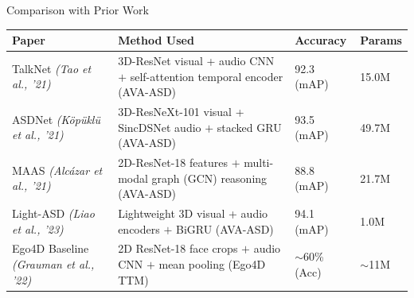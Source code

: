\documentclass[aspectratio=169, 10pt]{beamer}
\begin{document}


\begin{frame}{Comparison with Prior Work}

\begin{center}
\scriptsize
\renewcommand{\arraystretch}{1.3}
\setlength{\tabcolsep}{6pt}
\begin{tabular}{@{}p{2.5cm} p{4.6cm} p{2.0cm} p{1.2cm}@{}}
\toprule
\textbf{Paper} & \textbf{Method Used} & \textbf{Accuracy} & \textbf{Params}\\
\midrule
TalkNet \newline\textit{(Tao et al., '21)}
 & 3D-ResNet visual + audio CNN $+$ self-attention temporal encoder (AVA-ASD)
 & 92.3 (mAP) & 15.0M \\

ASDNet \newline\textit{(Köpüklü et al., '21)}
 & 3D-ResNeXt-101 visual + SincDSNet audio $+$ stacked GRU (AVA-ASD)
 & 93.5 (mAP) & 49.7M \\

MAAS \newline\textit{(Alcázar et al., '21)}
 & 2D-ResNet-18 features $+$ multi-modal graph (GCN) reasoning (AVA-ASD)
 & 88.8 (mAP) & 21.7M \\

Light-ASD \newline\textit{(Liao et al., '23)}
 & Lightweight 3D visual + audio encoders $+$ BiGRU (AVA-ASD)
 & 94.1 (mAP) & 1.0M  \\

Ego4D Baseline \newline\textit{(Grauman et al., '22)}
 & 2D ResNet-18 face crops $+$ audio CNN $+$ mean pooling (Ego4D TTM)
 & $\sim$60\% (Acc) & $\sim$11M \\


\end{tabular}
\end{center}
\end{frame}
\end{document}
